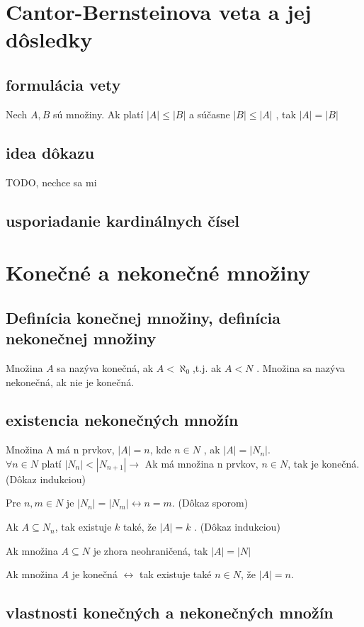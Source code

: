 \section {Cantor-Bernsteinova veta a jej dôsledky}
 	\subsection{formulácia vety}
 		Nech $A, B$ sú množiny. Ak platí $|A| \leq |B|$ a súčasne $|B| \leq |A|$ , tak $|A| = |B|$
 	\subsection{idea dôkazu}
 		TODO, nechce sa mi
 	\subsection{usporiadanie kardinálnych čísel}

\section {Konečné a nekonečné množiny}
	\subsection{Definícia konečnej množiny, definícia nekonečnej množiny}
		Množina $A$ sa nazýva konečná, ak $A < \aleph_{0}$,t.j. ak $A < N$ . Množina sa nazýva nekonečná, ak nie je konečná.

  	\subsection{existencia nekonečných množín} 
		Množina A má n prvkov, $|A| = n$, kde $n \in N$ , ak $|A| = |N_{n}|$.\\
		$ \forall n \in N$ platí $|N_{n}| < |N_{n+1}| \rightarrow $ Ak má množina n prvkov, $n \in N$, tak je konečná.
		(Dôkaz indukciou)

		Pre $n,m \in N$ je $|N_{n}| = |N_{m}|  \leftrightarrow n = m$.
		(Dôkaz sporom)

		Ak $A \subseteq N_{n}$, tak existuje $k$ také, že $|A| = k$ .
		(Dôkaz indukciou)

		Ak množina $A \subseteq N$ je zhora neohraničená, tak $|A| = |N|$

		Ak množina $A$ je konečná $\leftrightarrow$ tak existuje také $n \in N$, že $|A| = n$.

  	\subsection{vlastnosti konečných a nekonečných množín}

